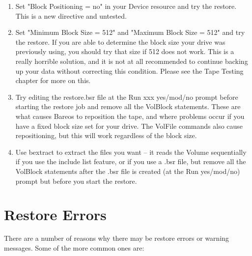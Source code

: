\begin{enumerate}
\item Set "Block Positioning = no" in your Device resource  and try the
   restore. This is a new directive and untested.

\item Set "Minimum Block Size = 512" and "Maximum  Block Size = 512" and
   try the restore.  If you are able to determine the block size your drive
   was previously using, you should try that size if 512 does not work.
   This is a really horrible solution, and it is not at all recommended
   to continue backing up your data without correcting this condition.
   Please see the Tape Testing chapter for more on this.

\item Try editing the restore.bsr file at the Run xxx yes/mod/no prompt
   before starting the restore job and remove all the VolBlock statements.
   These are what causes Bareos to reposition the tape, and where problems
   occur if you have a fixed block size set for your drive.  The VolFile
   commands also cause repositioning, but this will work regardless of the
   block size.

\item Use bextract to extract the files you want -- it reads the  Volume
   sequentially if you use the include list feature, or if you use a .bsr
   file, but remove all the VolBlock statements after the .bsr file is
   created (at the Run yes/mod/no) prompt but before you start the restore.
\end{enumerate}

\section{Restore Errors}

There are a number of reasons why there may be restore errors or
warning messages. Some of the more common ones are:

